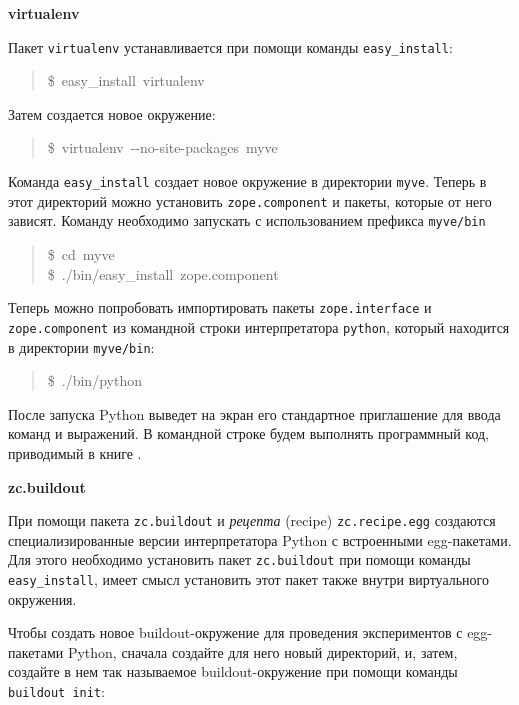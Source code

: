 \documentclass[a4paper,openany,twoside,final]{book}
\providecommand*{\DUroletitlereference}[1]{\textsl{#1}}
\begin{document}
\textbf{virtualenv}

Пакет \texttt{virtualenv} устанавливается при помощи команды
\texttt{easy\_install}:

\begin{quote}{\ttfamily \raggedright \noindent
\$~easy\_install~virtualenv
}
\end{quote}

Затем создается новое окружение:

\begin{quote}{\ttfamily \raggedright \noindent
\$~virtualenv~-{}-no-site-packages~myve
}
\end{quote}

Команда \texttt{easy\_install} создает новое окружение в директории
\texttt{myve}.  Теперь в этот директорий можно установить
\texttt{zope.component} и пакеты, которые от него зависят.  Команду
необходимо запускать с использованием префикса \texttt{myve/bin}

\begin{quote}{\ttfamily \raggedright \noindent
\$~cd~myve\\
\$~./bin/easy\_install~zope.component
}
\end{quote}

Теперь можно попробовать импортировать пакеты \texttt{zope.interface} и
\texttt{zope.component} из командной строки интерпретатора \texttt{python}, который
находится в директории \texttt{myve/bin}:

\begin{quote}{\ttfamily \raggedright \noindent
\$~./bin/python
}
\end{quote}

После запуска Python выведет на экран его стандартное приглашение для
ввода команд и выражений.  В командной строке будем выполнять
программный код, приводимый в книге .

\textbf{zc.buildout}

При помощи пакета \texttt{zc.buildout} и \DUroletitlereference{рецепта} (recipe)
\texttt{zc.recipe.egg} создаются специализированные версии интерпретатора
Python с встроенными egg-пакетами.  Для этого необходимо установить
пакет \texttt{zc.buildout} при помощи команды \texttt{easy\_install}, имеет смысл
установить этот пакет также внутри виртуального окружения.

Чтобы создать новое buildout-окружение для проведения экспериментов с
egg-пакетами Python, сначала создайте для него новый директорий, и,
затем, создайте в нем так называемое buildout-окружение при помощи
команды \texttt{buildout init}:
\end{document}
